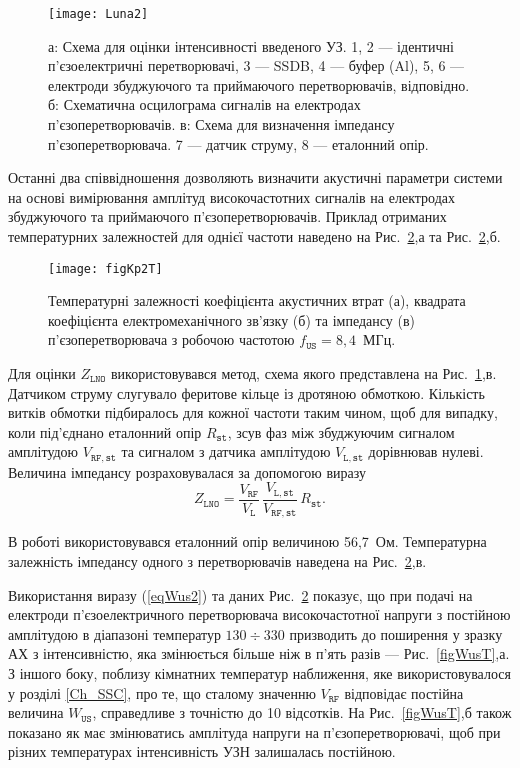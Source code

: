 \begin{figure}
\center
\texttt{[image: Luna2]}%
\caption{\label{Luna2}
а: Схема для оцінки інтенсивності введеного УЗ.
1, 2 --- ідентичні п'єзоелектричні перетворювачі,
3 --- SSDB,
4 --- буфер (Al),
5, 6 --- електроди збуджуючого та приймаючого перетворювачів, відповідно.
б: Схематична осцилограма сигналів на електродах п'єзоперетворювачів.
в: Схема для визначення імпедансу п'єзоперетворювача.
7 --- датчик струму,
8 --- еталонний опір.
}
\end{figure}

Останні два співвідношення дозволяють визначити акустичні параметри системи на основі вимірювання амплітуд
високочастотних сигналів на електродах збуджуючого та приймаючого п'єзоперетворювачів.
Приклад отриманих температурних залежностей для однієї частоти наведено на Рис.~\ref{figKp2T},а та Рис.~\ref{figKp2T},б.

\begin{figure}
\center
\texttt{[image: figKp2T]}%
\caption{\label{figKp2T}
Температурні залежності коефіцієнта акустичних втрат (а),
квадрата коефіцієнта електромеханічного зв'язку (б) та
імпедансу (в) п'єзоперетворювача з робочою частотою $f_\mathtt{US}=8,4$~МГц.
}
\end{figure}

Для оцінки $Z_\mathtt{LNO}$ використовувався метод,
схема якого представлена на Рис.~\ref{Luna2},в.
Датчиком струму слугувало феритове кільце із дротяною обмоткою.
Кількість витків обмотки підбиралось для кожної частоти таким чином, щоб для випадку, коли під'єднано еталонний опір $R_\mathtt{st}$,
зсув фаз між збуджуючим сигналом амплітудою $V_\mathtt{RF,st}$ та сигналом з датчика амплітудою $V_\mathtt{L,st}$
дорівнював нулеві.
Величина імпедансу розраховувалася за допомогою виразу
 \begin{equation}
 \label{eqZlno}
 Z_\mathtt{LNO}=\frac{V_\mathtt{RF}}{V_\mathtt{L}}\,\frac{V_\mathtt{L,st}}{V_\mathtt{RF,st}}\,R_\mathtt{st}.
 \end{equation}

В роботі використовувався еталонний опір величиною 56,7~Ом.
Температурна залежність імпедансу одного з перетворювачів наведена на Рис.~\ref{figKp2T},в.

Використання виразу (\ref{eqWus2}) та даних Рис.~\ref{figKp2T} показує, що при подачі на електроди п'єзоелектричного перетворювача
високочастотної напруги з постійною амплітудою в діапазоні температур $130\div330$ призводить до поширення у зразку АХ з
інтенсивністю, яка змінюється більше ніж в п'ять разів --- Рис.~\ref{figWusT},а.
З іншого боку, поблизу кімнатних температур наближення, яке використовувалося у розділі \ref{Ch_SSC}, про те, що сталому значенню
$V_\mathtt{RF}$ відповідає постійна величина $ W_\mathtt{US}$, справедливе з точністю до 10 відсотків.
На Рис.~\ref{figWusT},б також показано як має змінюватись амплітуда напруги на п'єзоперетворювачі, щоб при різних температурах
інтенсивність УЗН залишалась постійною.



